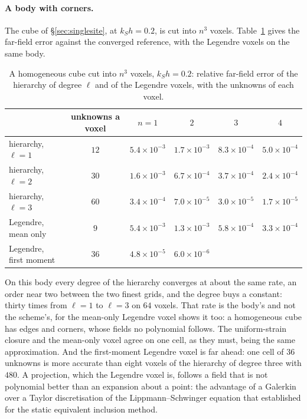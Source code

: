 \documentclass[11pt,a4paper]{article}
\begin{document}
\paragraph{A body with corners.} The cube of \S\ref{sec:singlesite}, at $k_Sh=0.2$, is cut into $n^3$
voxels. Table~\ref{tab:hiersub} gives the far-field error against the converged reference, with the
Legendre voxels on the same body.
\begin{table}[htbp]
\centering
\caption{A homogeneous cube cut into $n^3$ voxels, $k_Sh=0.2$: relative far-field error of the
hierarchy of degree $\ell$ and of the Legendre voxels, with the unknowns of each voxel.}\label{tab:hiersub}
\small
\begin{tabular}{@{}lccccc@{}}
\toprule
 & unknowns a voxel & $n=1$ & $2$ & $3$ & $4$ \\
\midrule
hierarchy, $\ell=1$ & $12$ & $5.4\times10^{-3}$ & $1.7\times10^{-3}$ & $8.3\times10^{-4}$ & $5.0\times10^{-4}$ \\
hierarchy, $\ell=2$ & $30$ & $1.6\times10^{-3}$ & $6.7\times10^{-4}$ & $3.7\times10^{-4}$ & $2.4\times10^{-4}$ \\
hierarchy, $\ell=3$ & $60$ & $3.4\times10^{-4}$ & $7.0\times10^{-5}$ & $3.0\times10^{-5}$ & $1.7\times10^{-5}$ \\
Legendre, mean only & $9$ & $5.4\times10^{-3}$ & $1.3\times10^{-3}$ & $5.8\times10^{-4}$ & $3.3\times10^{-4}$ \\
Legendre, first moment & $36$ & $4.8\times10^{-5}$ & $6.0\times10^{-6}$ & & \\
\bottomrule
\end{tabular}
\end{table}
On this body every degree of the hierarchy converges at about the same rate, an order near two between
the two finest grids, and the degree buys a constant: thirty times from $\ell=1$ to $\ell=3$ on $64$
voxels. That rate is the body's and not the scheme's, for the mean-only Legendre voxel shows it too: a
homogeneous cube has edges and corners, whose fields no polynomial follows. The uniform-strain closure
and the mean-only voxel agree on one cell, as they must, being the same approximation. And the
first-moment Legendre voxel is far ahead: one cell of $36$ unknowns is more accurate than eight voxels
of the hierarchy of degree three with $480$. A projection, which the Legendre voxel is, follows a field
that is not polynomial better than an expansion about a point: the advantage of a Galerkin over a Taylor
discretisation of the Lippmann--Schwinger equation that \citet{Brisard2014} established for the static
equivalent inclusion method.
\end{document}
